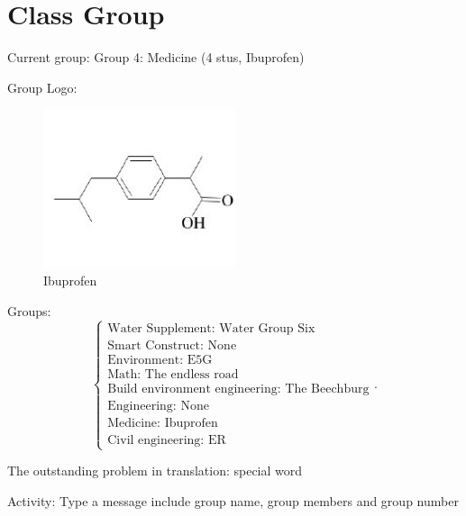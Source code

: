 \def\lecturer{XingYi He}
\def\noter{THF}
\def\className{Science Translation}
\def\term{III-B}



\maketitle
\tableofcontents
\section{Class Group}%
\label{sec:Class Group}
Current group: Group 4: Medicine (4 stus, Ibuprofen)

Group Logo:
\begin{figure}[htpb]
    \centering
    \includegraphics[width=0.5\textwidth]{Ibuprofen}
    \caption{Ibuprofen}
    \label{fig:Ibuprofen}
\end{figure}

Groups:
\[
    \begin{cases}
        \text{Water Supplement: Water Group Six}\\
        \text{Smart Construct: None}\\
        \text{Environment: E5G}\\
        \text{Math: The endless road}\\
        \text{Build environment engineering: The Beechburg}\\
        \text{Engineering: None}\\
        \text{Medicine: Ibuprofen}\\
        \text{Civil engineering: ER}
    \end{cases}
.\] 

The outstanding problem in translation: special word

Activity: Type a message include group name, group members and group number

